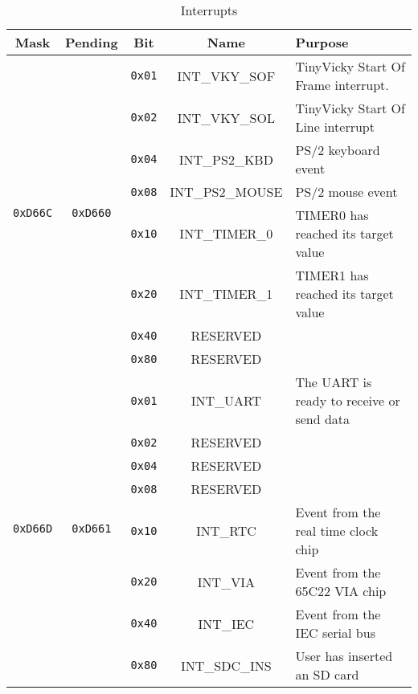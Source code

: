 \begin{table}[ht]
	\begin{center}
		\begin{tabular}{| c | c | c | c | l |} \hline
            Mask & Pending & Bit & Name & Purpose \\ \hline\hline

            \multirow{8}{*}{{\tt 0xD66C}} & \multirow{8}{*}{{\tt 0xD660}} & \verb+0x01+ & INT\_VKY\_SOF & TinyVicky Start Of Frame interrupt. \\ \cline{3-5}

            & & \verb+0x02+ & INT\_VKY\_SOL & TinyVicky Start Of Line interrupt \\ \cline{3-5}

            & & \verb+0x04+ & INT\_PS2\_KBD & PS/2 keyboard event \\ \cline{3-5}

            & & \verb+0x08+ & INT\_PS2\_MOUSE & PS/2 mouse event \\ \cline{3-5}

            & & \verb+0x10+ & INT\_TIMER\_0 & TIMER0 has reached its target value \\ \cline{3-5}

            & & \verb+0x20+ & INT\_TIMER\_1 & TIMER1 has reached its target value \\ \cline{3-5}

            & & \verb+0x40+ & RESERVED & \\ \cline{3-5}

            & & \verb+0x80+ & RESERVED & \\ \hline

            \multirow{8}{*}{{\tt 0xD66D}} & \multirow{8}{*}{{\tt 0xD661}} & \verb+0x01+ & INT\_UART & The UART is ready to receive or send data \\ \cline{3-5}

            & & \verb+0x02+ & RESERVED & \\ \cline{3-5}

            & & \verb+0x04+ & RESERVED & \\ \cline{3-5}

            & & \verb+0x08+ & RESERVED & \\ \cline{3-5}

            & & \verb+0x10+ & INT\_RTC & Event from the real time clock chip \\ \cline{3-5}

            & & \verb+0x20+ & INT\_VIA & Event from the 65C22 VIA chip \\ \cline{3-5}

            & & \verb+0x40+ & INT\_IEC & Event from the IEC serial bus \\ \cline{3-5}

            & & \verb+0x80+ & INT\_SDC\_INS & User has inserted an SD card \\ \hline
        \end{tabular}
    \end{center}
	\caption{Interrupts}
	\label{tab:interrupts}
\end{table}

